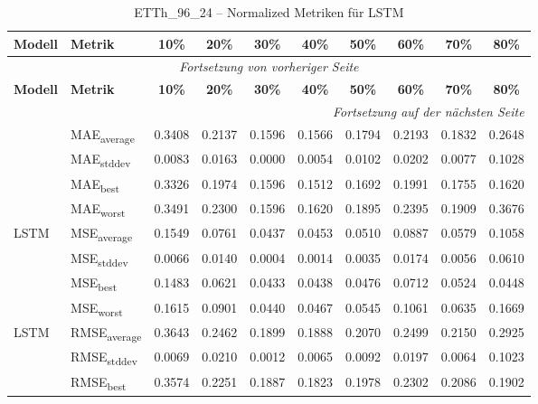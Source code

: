{\small
\begin{longtable}{l l c c c c c c c c}
    \toprule
    \textbf{Modell} & \textbf{Metrik} & \textbf{10\%} & \textbf{20\%} & \textbf{30\%} & \textbf{40\%} & \textbf{50\%} & \textbf{60\%} & \textbf{70\%} & \textbf{80\%} \\
    \midrule
    \endfirsthead
    \multicolumn{10}{c}{\textit{Fortsetzung von vorheriger Seite}} \\
    \toprule
    \textbf{Modell} & \textbf{Metrik} & \textbf{10\%} & \textbf{20\%} & \textbf{30\%} & \textbf{40\%} & \textbf{50\%} & \textbf{60\%} & \textbf{70\%} & \textbf{80\%} \\
    \midrule
    \endhead
    \midrule
    \multicolumn{10}{r}{\textit{Fortsetzung auf der nächsten Seite}} \\
    \midrule
    \endfoot
    \bottomrule
    \caption{ETTh_96_24 -- Normalized Metriken für LSTM}
    \label{tab:etth_96_24_normalized_lstm}
    \endlastfoot
\multirow{4}{*}{LSTM} & MAE\textsubscript{average} & 0.3408 & 0.2137 & 0.1596 & 0.1566 & 0.1794 & 0.2193 & 0.1832 & 0.2648 \\
 & MAE\textsubscript{stddev} & 0.0083 & 0.0163 & 0.0000 & 0.0054 & 0.0102 & 0.0202 & 0.0077 & 0.1028 \\
 & MAE\textsubscript{best} & 0.3326 & 0.1974 & 0.1596 & 0.1512 & 0.1692 & 0.1991 & 0.1755 & 0.1620 \\
 & MAE\textsubscript{worst} & 0.3491 & 0.2300 & 0.1596 & 0.1620 & 0.1895 & 0.2395 & 0.1909 & 0.3676 \\
\cmidrule(lr){2-10}
\multirow{4}{*}{LSTM} & MSE\textsubscript{average} & 0.1549 & 0.0761 & 0.0437 & 0.0453 & 0.0510 & 0.0887 & 0.0579 & 0.1058 \\
 & MSE\textsubscript{stddev} & 0.0066 & 0.0140 & 0.0004 & 0.0014 & 0.0035 & 0.0174 & 0.0056 & 0.0610 \\
 & MSE\textsubscript{best} & 0.1483 & 0.0621 & 0.0433 & 0.0438 & 0.0476 & 0.0712 & 0.0524 & 0.0448 \\
 & MSE\textsubscript{worst} & 0.1615 & 0.0901 & 0.0440 & 0.0467 & 0.0545 & 0.1061 & 0.0635 & 0.1669 \\
\cmidrule(lr){2-10}
\multirow{4}{*}{LSTM} & RMSE\textsubscript{average} & 0.3643 & 0.2462 & 0.1899 & 0.1888 & 0.2070 & 0.2499 & 0.2150 & 0.2925 \\
 & RMSE\textsubscript{stddev} & 0.0069 & 0.0210 & 0.0012 & 0.0065 & 0.0092 & 0.0197 & 0.0064 & 0.1023 \\
 & RMSE\textsubscript{best} & 0.3574 & 0.2251 & 0.1887 & 0.1823 & 0.1978 & 0.2302 & 0.2086 & 0.1902 \\

\end{longtable}}
